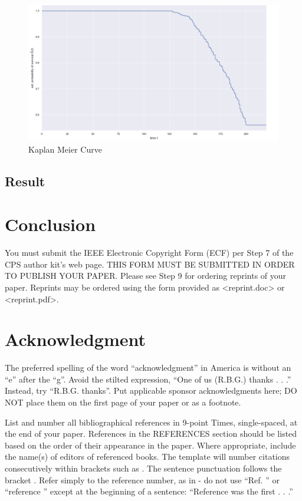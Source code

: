 \documentclass[conference]{IEEEconf}
\begin{document}
\begin{figure}[htbp]
	\centering
	\includegraphics[scale=0.26]{Kaplan_Meier.png}
	\caption{Kaplan Meier Curve}
\end{figure}
\subsection{Result}

\section{Conclusion}
You must submit the IEEE Electronic Copyright Form (ECF) per Step 7 of the CPS author kit’s web page. THIS FORM MUST BE SUBMITTED IN ORDER TO PUBLISH YOUR PAPER.
Please see Step 9 for ordering reprints of your paper. Reprints may be ordered using the form provided as <reprint.doc> or <reprint.pdf>.


\section*{Acknowledgment}
The preferred spelling of the word “acknowledgment” in America is without an “e” after the “g”. Avoid the stilted expression, “One of us (R.B.G.) thanks . . .”  Instead, try 
“R.B.G. thanks”. Put applicable sponsor acknowledgments here; DO NOT place them on the first page of your paper or as a footnote.

List and number all bibliographical references in 9-point Times, single-spaced, at the end of your paper. References in the  REFERENCES section should be listed based on the order of their appearance in the paper. Where appropriate, include the name(s) of editors of referenced books. The template will number citations consecutively within brackets such as \cite{ref1}\cite{ref2}\cite{ref3}. The sentence punctuation follows the bracket \cite{ref2}. Refer simply to the reference number, as in \cite{ref3} - do not use “Ref. \cite{ref3}” or “reference \cite{ref3}” except at the beginning of a sentence: “Reference \cite{ref3} was the first . . .”
\end{document}
